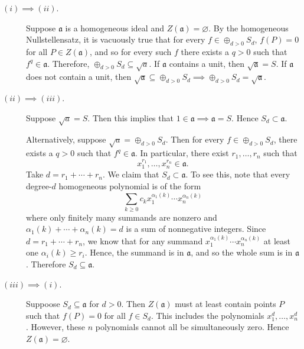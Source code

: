 \documentclass{hw_pset} %
\newcommand{\idl}[1]{\mathfrak{#1}} %
\begin{document}
\begin{solution}
    \begin{description}
        \item[$(i) \implies (ii)$.] 
        Suppose $\idl{a}$ is a homogeneous ideal and $Z(\idl{a}) = \varnothing$. By the 
        homogeneous Nullstellensatz, it is vacuously true that for every 
        $f \in \oplus_{d > 0}S_d$, $f(P) = 0$ for all $P \in Z(\idl{a})$, and so 
        for every such $f$ there exists a $q > 0$ such that $f^q \in \idl{a}$. 
        Therefore, $\oplus_{d > 0}S_d \subseteq \sqrt{a}$. If $\idl{a}$ contains 
        a unit, then $\sqrt{\idl{a}} = S$. If $\idl{a}$ does not contain a unit, then 
        $\sqrt{\idl{a}} \subseteq \oplus_{d > 0}S_d \implies \oplus_{d > 0}S_d = \sqrt{\idl{a}}$.

        \item[$(ii) \implies (iii)$.] 
        Suppose $\sqrt{a} = S$. Then this implies that $1 \in \idl{a} \implies \idl{a} = S$. Hence $S_d \subset \idl{a}$.

        Alternatively, suppose $\sqrt{a} = \oplus_{d > 0}S_d$. Then for every $f \in \oplus_{d > 0}S_d$, 
        there exists a $q > 0$ such that $f^q \in \idl{a}$. In particular, there 
        exist $r_1, \dots, r_n$ such that 
        \[
            x_1^{r_1}, \dots, x_n^{r_n} \in \idl{a}.
        \]
        Take $d = r_1 + \cdots + r_n$. We claim that $S_d \subset \idl{a}$. 
        To see this, note that every degree-$d$ homogeneous polynomial is of the form 
        \[
            \sum_{k \ge 0}c_k x_1^{\alpha_1(k)} \cdots  x_n^{\alpha_n(k)}
        \]
        where only finitely many summands are nonzero and $\alpha_1(k) + \cdots + \alpha_n(k) = d$ is a sum 
        of nonnegative integers. Since 
        $d = r_1 + \cdots + r_n$, we know that for any summand $x_1^{\alpha_1(k)} \cdots  x_n^{\alpha_n(k)}$
        at least one $\alpha_i(k) \ge r_i$. Hence, the summand is in $\idl{a}$, and so the whole 
        sum is in $\idl{a}$. Therefore $S_d \subseteq \idl{a}$. 

        \item[$(iii) \implies (i)$.] 
        Suppoose $S_d \subseteq \idl{a}$ for $d > 0$. Then $Z(\idl{a})$ must 
        at least contain points $P$ such that $f(P) = 0$ for all $f \in S_d$.
        This includes the polynomials $x_1^d, \dots, x_n^d$. However, these $n$ polynomials 
        cannot all be simultaneously zero. Hence $Z(\idl{a}) = \varnothing$. 
    
    \end{description}    
\end{solution}
\end{document}
